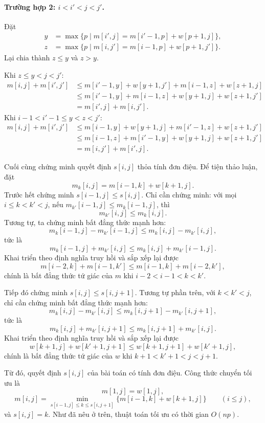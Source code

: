 \documentclass[11pt]{article}
\begin{document}
\paragraph{Trường hợp 2: \(i<i'<j<j'\).}
Đặt
\[
\begin{aligned}
y&=\max\{p\mid m[i',j]=m[i'-1,p]+w[p+1,j]\},\\
z&=\max\{p\mid m[i,j']=m[i-1,p]+w[p+1,j']\}.
\end{aligned}
\]
Lại chia thành \(z\le y\) và \(z>y\).

Khi \(z\le y<j<j'\):
\[
\begin{aligned}
m[i,j]+m[i',j']
&\le m[i'-1,y]+w[y+1,j']+m[i-1,z]+w[z+1,j]\\
&\le m[i'-1,y]+m[i-1,z]+w[y+1,j]+w[z+1,j']\\
&=m[i',j]+m[i,j'].
\end{aligned}
\]
Khi \(i-1<i'-1\le y<z<j'\):
\[
\begin{aligned}
m[i,j]+m[i',j']
&\le m[i-1,y]+w[y+1,j]+m[i'-1,z]+w[z+1,j']\\
&\le m[i-1,z]+m[i'-1,y]+w[y+1,j]+w[z+1,j']\\
&=m[i,j']+m[i',j].
\end{aligned}
\]

Cuối cùng chứng minh quyết định \(s[i,j]\) thỏa tính đơn điệu. Để tiện thảo
luận, đặt
\[
  m_k[i,j]=m[i-1,k]+w[k+1,j].
\]
Trước hết chứng minh \(s[i-1,j]\le s[i,j]\). Chỉ cần chứng minh: với mọi
\(i\le k<k'<j\), nếu \(m_{k'}[i-1,j]\le m_k[i-1,j]\), thì
\[
  m_{k'}[i,j]\le m_k[i,j].
\]
Tương tự, ta chứng minh bất đẳng thức mạnh hơn:
\[
  m_k[i-1,j]-m_{k'}[i-1,j]\le m_k[i,j]-m_{k'}[i,j],
\]
tức là
\[
  m_k[i-1,j]+m_{k'}[i,j]\le m_k[i,j]+m_{k'}[i-1,j].
\]
Khai triển theo định nghĩa truy hồi và sắp xếp lại được
\[
  m[i-2,k]+m[i-1,k']\le m[i-1,k]+m[i-2,k'],
\]
chính là bất đẳng thức tứ giác của \(m\) khi \(i-2<i-1<k<k'\).

Tiếp đó chứng minh \(s[i,j]\le s[i,j+1]\). Tương tự phần trên, với
\(k<k'<j\), chỉ cần chứng minh bất đẳng thức mạnh hơn:
\[
  m_k[i,j]-m_{k'}[i,j]\le m_k[i,j+1]-m_{k'}[i,j+1],
\]
tức là
\[
  m_k[i,j]+m_{k'}[i,j+1]\le m_k[i,j+1]+m_{k'}[i,j].
\]
Khai triển theo định nghĩa truy hồi và sắp xếp lại được
\[
  w[k+1,j]+w[k'+1,j+1]\le w[k+1,j+1]+w[k'+1,j],
\]
chính là bất đẳng thức tứ giác của \(w\) khi \(k+1<k'+1<j<j+1\).

Từ đó, quyết định \(s[i,j]\) của bài toán có tính đơn điệu. Công thức chuyển
tối ưu là
\[
  m[1,j]=w[1,j],
\]
\[
  m[i,j]=
  \min_{s[i-1,j]\le k\le s[i,j+1]}
  \{m[i-1,k]+w[k+1,j]\}\qquad (i\le j),
\]
và \(s[i,j]=k\). Như đã nêu ở trên, thuật toán tối ưu có thời gian \(O(np)\).
\end{document}
